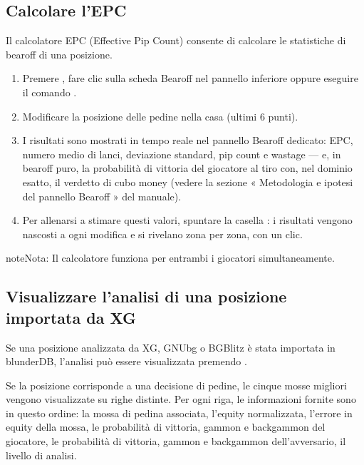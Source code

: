 \documentclass[letterpaper,10pt,italian]{sphinxmanual}
\begin{document}
\subsection{Calcolare l’EPC}
\label{\detokenize{guide_utilisateur:calculer-l-epc}}
\sphinxAtStartPar
Il calcolatore EPC (Effective Pip Count) consente di calcolare le statistiche di bearoff di una posizione.
\begin{enumerate}
%
\item {} 
\sphinxAtStartPar
Premere , fare clic sulla scheda Bearoff nel pannello inferiore oppure eseguire il comando .

\item {} 
\sphinxAtStartPar
Modificare la posizione delle pedine nella casa (ultimi 6 punti).

\item {} 
\sphinxAtStartPar
I risultati sono mostrati in tempo reale nel pannello Bearoff dedicato: EPC, numero medio di lanci, deviazione standard, pip count e wastage — e, in bearoff puro, la probabilità di vittoria del giocatore al tiro con, nel dominio esatto, il verdetto di cubo money (vedere la sezione « Metodologia e ipotesi del pannello Bearoff » del manuale).

\item {} 
\sphinxAtStartPar
Per allenarsi a stimare questi valori, spuntare la casella : i risultati vengono nascosti a ogni modifica e si rivelano zona per zona, con un clic.

\end{enumerate}

\begin{sphinxadmonition}{note}{Nota:}
\sphinxAtStartPar
Il calcolatore funziona per entrambi i giocatori simultaneamente.
\end{sphinxadmonition}


\subsection{Visualizzare l’analisi di una posizione importata da XG}
\label{\detokenize{guide_utilisateur:afficher-l-analyse-d-une-position-importee-depuis-xg}}
\sphinxAtStartPar
Se una posizione analizzata da XG, GNUbg o BGBlitz è stata importata in blunderDB, l’analisi può essere visualizzata premendo .

\sphinxAtStartPar
Se la posizione corrisponde a una decisione di pedine, le cinque mosse migliori vengono visualizzate su righe distinte. Per ogni riga, le informazioni fornite sono in questo ordine: la mossa di pedina associata, l’equity normalizzata, l’errore in equity della mossa, le probabilità di vittoria, gammon e backgammon del giocatore, le probabilità di vittoria, gammon e backgammon dell’avversario, il livello di analisi.
\end{document}
